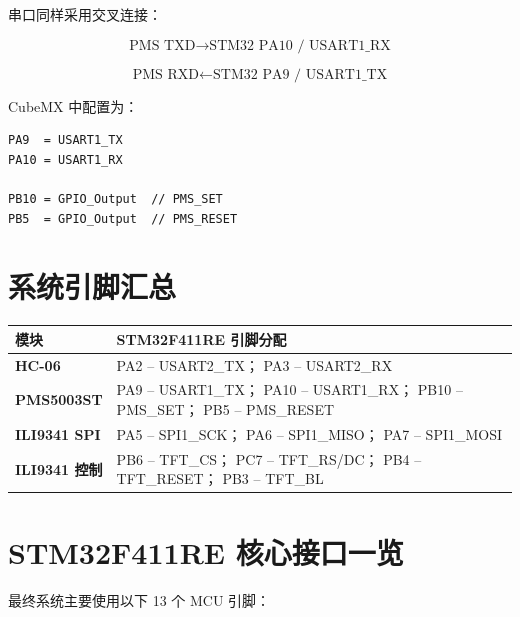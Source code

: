 \documentclass[12pt,a4paper]{ctexart}
\begin{document}
串口同样采用交叉连接：

\[
\text{PMS TXD}
\rightarrow
\text{STM32 PA10 / USART1\_RX}
\]

\[
\text{PMS RXD}
\leftarrow
\text{STM32 PA9 / USART1\_TX}
\]

CubeMX 中配置为：

\begin{verbatim}
PA9  = USART1_TX
PA10 = USART1_RX

PB10 = GPIO_Output  // PMS_SET
PB5  = GPIO_Output  // PMS_RESET
\end{verbatim}

\section{系统引脚汇总}

\begin{table}[htbp]
\centering
{}
\begin{tabularx}{\textwidth}{>{\bfseries}Y L}
\toprule
{}
\color{white}模块 &
\color{white}STM32F411RE 引脚分配 \\
\midrule
HC-06 &
PA2 -- USART2\_TX；
PA3 -- USART2\_RX \\

PMS5003ST &
PA9 -- USART1\_TX；
PA10 -- USART1\_RX；
PB10 -- PMS\_SET；
PB5 -- PMS\_RESET \\

ILI9341 SPI &
PA5 -- SPI1\_SCK；
PA6 -- SPI1\_MISO；
PA7 -- SPI1\_MOSI \\

ILI9341 控制 &
PB6 -- TFT\_CS；
PC7 -- TFT\_RS/DC；
PB4 -- TFT\_RESET；
PB3 -- TFT\_BL \\
\bottomrule
\end{tabularx}
\end{table}

\section{STM32F411RE 核心接口一览}

最终系统主要使用以下 13 个 MCU 引脚：
\end{document}
